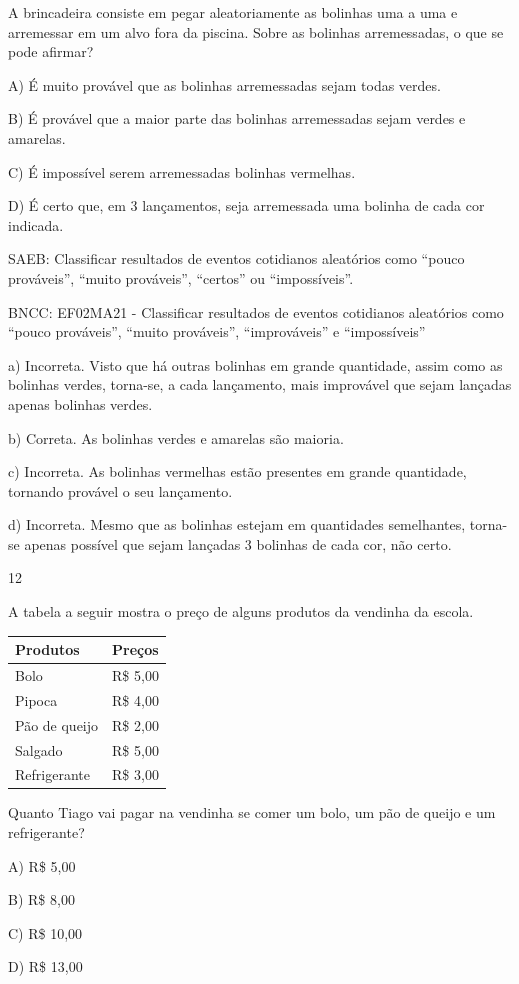 \begin{escolha}
\begin{escolha}
{{{{A brincadeira consiste em pegar aleatoriamente as bolinhas uma a uma e
arremessar em um alvo fora da piscina. Sobre as bolinhas arremessadas, o que se pode afirmar?

A) É muito provável que as bolinhas arremessadas sejam todas verdes.

B) É provável que a maior parte das bolinhas arremessadas sejam verdes e amarelas.

C) É impossível serem arremessadas bolinhas vermelhas.

D) É certo que, em 3 lançamentos, seja arremessada uma bolinha de cada cor
indicada.

SAEB: Classificar resultados de eventos cotidianos aleatórios
como ``pouco prováveis'', ``muito prováveis'', ``certos'' ou
``impossíveis''.

BNCC: EF02MA21 - Classificar resultados de eventos cotidianos aleatórios
como ``pouco prováveis'', ``muito prováveis'', ``improváveis'' e
``impossíveis''

a) Incorreta. Visto que há outras bolinhas em grande quantidade, assim
como as bolinhas verdes, torna-se, a cada lançamento, mais improvável
que sejam lançadas apenas bolinhas verdes.

b) Correta. As bolinhas verdes e amarelas são maioria.

c) Incorreta. As bolinhas vermelhas estão presentes em grande
quantidade, tornando provável o seu lançamento.

d) Incorreta. Mesmo que as bolinhas estejam em quantidades semelhantes,
torna-se apenas possível que sejam lançadas 3 bolinhas de cada cor, não certo.

\num{12}

A tabela a seguir mostra o preço de alguns produtos da vendinha da escola.

\begin{longtable}[]{@{}ll@{}}
\toprule
Produtos & Preços\tabularnewline
\midrule
\endhead
Bolo & R\$ 5,00\tabularnewline
Pipoca & R\$ 4,00\tabularnewline
Pão de queijo & R\$ 2,00\tabularnewline
Salgado & R\$ 5,00\tabularnewline
Refrigerante & R\$ 3,00\tabularnewline
\bottomrule
\end{longtable}

Quanto Tiago vai pagar na vendinha se comer um bolo, um pão de queijo e um refrigerante?

A) R\$ 5,00

B) R\$ 8,00

C) R\$ 10,00

D) R\$ 13,00

}}}}
\end{escolha}
\end{escolha}
